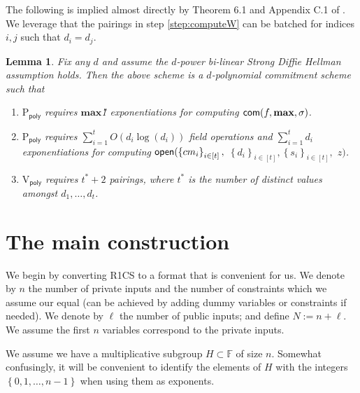 \documentclass[11pt]{article}
\numberwithin{figure}{section} %
\newtheorem{lemma}[thm]{Lemma}
\renewcommand{\max}{\ensuremath{\mathrm{\mathbf{max}}}\xspace}
\newcommand{\set}[1]{\ensuremath{\left\{#1\right\}}\xspace}
\newcommand{\F}{\ensuremath{\mathbb F}\xspace}
\newcommand{\defeq}{:=}
\newcommand{\sett}[2]{\ensuremath{\set{#1}_{#2}}\xspace}
\newcommand{\prvpoly}{\ensuremath{\mathrm{P_{\mathsf{poly}}}}\xspace}
\newcommand{\verpoly}{\ensuremath{\mathrm{V_{\mathsf{poly}}}}\xspace}
\begin{document}
The following is implied almost directly by Theorem 6.1 and Appendix C.1 of  \cite{sonic}. We leverage that the pairings in step \ref{step:computeW} can be batched for indices $i,j$ such that $d_i=d_j$.
\begin{lemma}\label{lem:pcSCHEME}
Fix any $d$ and assume the $d$-power bi-linear Strong Diffie Hellman assumption holds.
 Then the above scheme is a $d$-polynomial commitment scheme such that
 \begin{enumerate}
  \item \prvpoly requires \max \G1 exponentiations for computing $\com(f,\max,\srs)$.
  \item \prvpoly requires $\sum_{i=1}^t O(d_i\log(d_i))$ field operations and  $\sum_{i=1}^t d_i$ exponentiations for computing $\open(\sett{cm_i}{i\in [t]},$ $\sett{d_i}{i\in [t]},\sett{s_i}{i\in [t]},$ $z)$.
\item \verpoly requires $t^*+2$ pairings, where $t^*$ is the number of distinct values amongst $d_1,\ldots,d_t$.
  \end{enumerate}

\end{lemma}


\section{The main construction}\label{sec:main}
We begin by converting R1CS to a format that is convenient for us.
We denote by $n$ the number of private inputs and the number of constraints which we assume our equal (can be achieved by adding dummy variables or constraints if needed).
We denote by $\ell$ the number of public inputs; and define $N\defeq n+\ell$.
We assume the first $n$ variables correspond to the private inputs.

We assume we have a multiplicative subgroup $H\subset \F$ of size $n$.
Somewhat confusingly, it will be convenient to identify the elements of $H$ with the integers $\set{0,1,\ldots,n-1}$ when using them as exponents.
\end{document}
